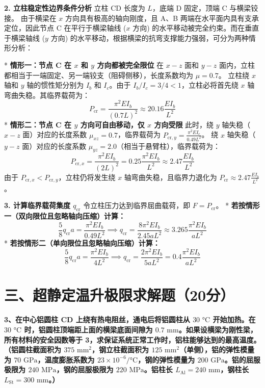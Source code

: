 \documentclass[UTF8,fontset=windows]{ctexart}
\begin{document}
\textbf{2. 立柱稳定性边界条件分析}
立柱 CD 长度为 $L$，底端 D 固定，顶端 C 与横梁铰接。
由于横梁在 $x$ 方向具有极高的轴向刚度，且 A、B 两端在水平面内具有支承定位，因此节点 C 在平行于横梁轴线 ($x$ 方向) 的水平移动被完全约束。而在垂直于横梁轴线 ($y$ 方向) 的水平移动，根据横梁的抗弯支撑能力强弱，可分为两种情形分析：

*   \textbf{情形一：节点 C 在 $x$ 和 $y$ 方向都被完全限位}
    在 $x-z$ 面和 $y-z$ 面内，立柱都相当于一端固定、另一端铰支（阻碍侧移），长度系数均为 $\mu = 0.7$。
    立柱绕 $x$ 轴和 $y$ 轴的惯性矩分别为 $I_b$ 和 $I_c$。由于 $I_b/I_c = 3/4 < 1$，立柱必将首先绕 $x$ 轴弯曲失稳。其临界载荷为：
    \[
        P_{\text{cr}} = \frac{\pi^2 E I_b}{(0.7 L)^2} \approx 20.16 \frac{E I_b}{L^2}
    \]
*   \textbf{情形二：节点 C 在 $y$ 方向可自由移动，仅 $x$ 方向受限}
    此时，绕 $y$ 轴失稳（$x-z$ 面）对应的长度系数 $\mu_{xz} = 0.7$，临界载荷为 $P_{\text{cr}, y} = \frac{\pi^2 E I_c}{0.49 L^2}$。
    绕 $x$ 轴失稳（$y-z$ 面）对应的长度系数 $\mu_{yz} = 2.0$（相当于悬臂柱），临界载荷为：
    \[
        P_{\text{cr}, x} = \frac{\pi^2 E I_b}{(2 L)^2} = 0.25 \frac{\pi^2 E I_b}{L^2} \approx 2.47 \frac{E I_b}{L^2}
    \]
    由于 $P_{\text{cr}, x} < P_{\text{cr}, y}$，立柱仍将发生绕 $x$ 轴弯曲失稳，且临界力退化为 $P_{\text{cr}} \approx 2.47 \frac{E I_b}{L^2}$。

\textbf{3. 计算临界载荷集度 $q_{\text{cr}}$}
令立柱压力达到临界屈曲载荷，即 $F = P_{\text{cr}}$。
*   \textbf{若按情形一（双向限位且忽略轴向压缩）计算：}
    \[
        \frac{5}{8} q_{\text{cr}} a = \frac{\pi^2 E I_b}{0.49 L^2} \implies q_{\text{cr}} = \frac{8 \pi^2 E I_b}{2.45 a L^2} \approx 3.265 \frac{\pi^2 E I_b}{a L^2}
    \]
*   \textbf{若按情形二（单向限位且忽略轴向压缩）计算：}
    \[
        \frac{5}{8} q_{\text{cr}} a = \frac{\pi^2 E I_b}{4 L^2} \implies q_{\text{cr}} = \frac{2 \pi^2 E I_b}{5 a L^2} = 0.4 \frac{\pi^2 E I_b}{a L^2}
    \]

\newpage

\section*{三、超静定温升极限求解题（20分）}

\textbf{3、在中心铝圆柱 CD 上绕有热电阻丝，通电后将铝圆柱从 $30\text{ °C}$ 开始加热。在 $30\text{ °C}$ 时，铝圆柱顶端距上面的横梁底面间隙为 $0.7\text{ mm}$。如果设横梁为刚性梁，所有材料的安全因数等于 3，求保证系统正常工作时，铝柱能够达到的最高温度。}
\textbf{（铝圆柱截面积为 $375\text{ mm}^2$，钢立柱截面积为 $125\text{ mm}^2$（单侧），铝的弹性模量为 $70\text{ GPa}$，温度膨胀系数为 $23 \times 10^{-6}/\text{°C}$，钢的弹性模量为 $200\text{ GPa}$。铝的屈服极限为 $240\text{ MPa}$，钢的屈服极限为 $220\text{ MPa}$。铝柱长 $L_{\text{Al}} = 240\text{ mm}$，钢柱长 $L_{\text{St}} = 300\text{ mm}$。）}
\end{document}
